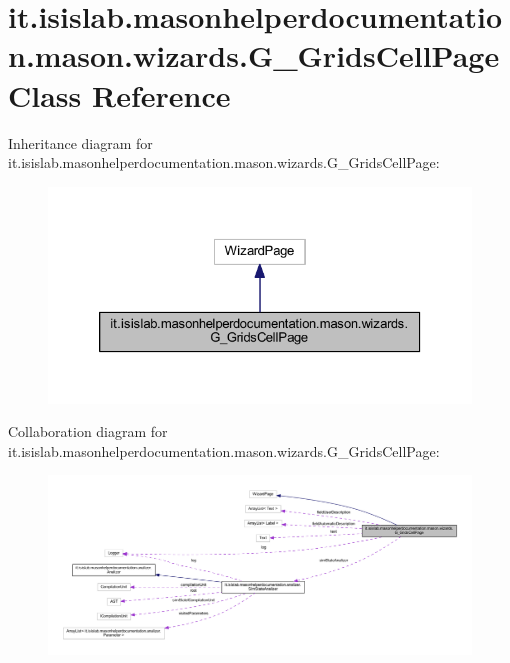 \hypertarget{classit_1_1isislab_1_1masonhelperdocumentation_1_1mason_1_1wizards_1_1_g___grids_cell_page}{\section{it.\-isislab.\-masonhelperdocumentation.\-mason.\-wizards.\-G\-\_\-\-Grids\-Cell\-Page Class Reference}
\label{classit_1_1isislab_1_1masonhelperdocumentation_1_1mason_1_1wizards_1_1_g___grids_cell_page}
}


Inheritance diagram for it.\-isislab.\-masonhelperdocumentation.\-mason.\-wizards.\-G\-\_\-\-Grids\-Cell\-Page\-:
\nopagebreak
\begin{figure}[H]
\begin{center}
\leavevmode
\includegraphics[width=326pt]{classit_1_1isislab_1_1masonhelperdocumentation_1_1mason_1_1wizards_1_1_g___grids_cell_page__inherit__graph}
\end{center}
\end{figure}


Collaboration diagram for it.\-isislab.\-masonhelperdocumentation.\-mason.\-wizards.\-G\-\_\-\-Grids\-Cell\-Page\-:
\nopagebreak
\begin{figure}[H]
\begin{center}
\leavevmode
\includegraphics[width=350pt]{classit_1_1isislab_1_1masonhelperdocumentation_1_1mason_1_1wizards_1_1_g___grids_cell_page__coll__graph}
\end{center}
\end{figure}
